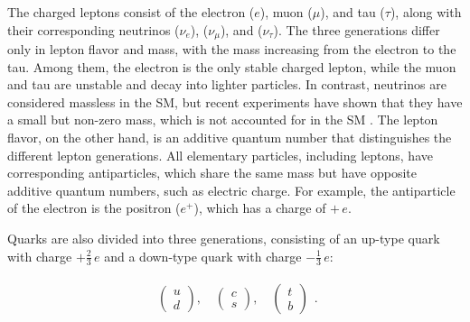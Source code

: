 The charged leptons consist of the electron ($e$), muon ($\mu$), and tau ($\tau$), along with their corresponding neutrinos
($\nu_e$), ($\nu_\mu$), and ($\nu_\tau$). The three generations differ only in lepton flavor and mass, with the mass increasing
from the electron to the tau. Among them, the electron is the only stable charged lepton, while the muon and tau are
unstable and decay into lighter particles. In contrast, neutrinos are considered massless in the SM, but recent experiments have shown that they have a
small but non-zero mass, which is not accounted for in the SM \cite{neutrino_osc}. The lepton flavor, on the other hand, is an additive quantum number that distinguishes the different lepton generations. All elementary particles, including leptons, have corresponding antiparticles, which share the same mass but have opposite additive quantum numbers, such as electric charge. For example, the antiparticle of the electron is the positron ($e^+$), 
which has a charge of $+\,e$.

Quarks are also divided into three generations, consisting of an up-type quark with charge $+\tfrac{2}{3}\,e$ and a 
down-type quark with charge $-\tfrac{1}{3}\,e$:

\begin{align*}
    \begin{array}{c}
        \begin{pmatrix}
            u \\
            d
        \end{pmatrix},\quad
        \begin{pmatrix}
            c \\
            s
        \end{pmatrix},\quad
        \begin{pmatrix}
            t \\
            b
        \end{pmatrix}
    \end{array}
    .
\end{align*}

